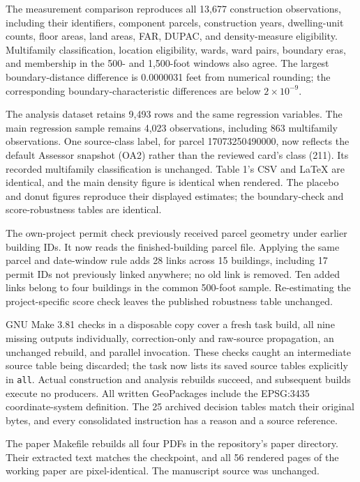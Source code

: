 The measurement comparison reproduces all 13,677 construction observations,
including their identifiers, component parcels, construction years, dwelling-unit
counts, floor areas, land areas, FAR, DUPAC, and density-measure eligibility.
Multifamily classification, location eligibility, wards, ward pairs, boundary
eras, and membership in the 500- and 1,500-foot windows also agree. The largest
boundary-distance difference is 0.0000031 feet from numerical rounding; the
corresponding boundary-characteristic differences are below $2\times10^{-9}$.

The analysis dataset retains 9,493 rows and the same regression variables. The
main regression sample remains 4,023 observations, including 863 multifamily
observations. One source-class label, for parcel 17073250490000, now reflects the
default Assessor snapshot (OA2) rather than the reviewed card's class (211). Its
recorded multifamily classification is unchanged. Table 1's CSV and LaTeX are
identical, and the main density figure is identical when rendered. The placebo
and donut figures reproduce their displayed estimates; the boundary-check and
score-robustness tables are identical.

The own-project permit check previously received parcel geometry under earlier
building IDs. It now reads the finished-building parcel file. Applying the same
parcel and date-window rule adds 28 links across 15 buildings, including 17 permit
IDs not previously linked anywhere; no old link is removed. Ten added links
belong to four buildings in the common 500-foot sample. Re-estimating the
project-specific score check leaves the published robustness table unchanged.

GNU Make 3.81 checks in a disposable copy cover a fresh task build, all nine
missing outputs individually, correction-only and raw-source propagation, an
unchanged rebuild, and parallel invocation. These checks caught an intermediate
source table being discarded; the task now lists its saved source tables
explicitly in \texttt{all}. Actual construction and analysis rebuilds succeed,
and subsequent builds execute no producers. All written GeoPackages include
the EPSG:3435 coordinate-system definition. The 25 archived decision tables
match their original bytes, and every consolidated instruction has a reason
and a source reference.

The paper Makefile rebuilds all four PDFs in the repository's paper directory.
Their extracted text matches the checkpoint, and all 56 rendered pages of the
working paper are pixel-identical. The manuscript source was unchanged.
